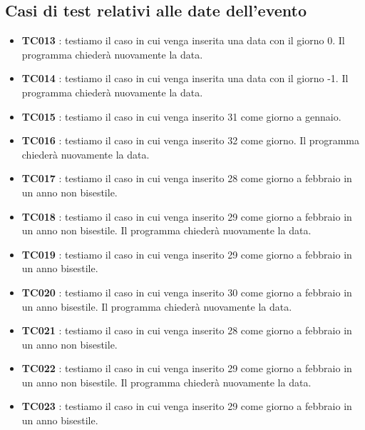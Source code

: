 \documentclass[11pt]{scrartcl} %
\begin{document}
\subsection{Casi di test relativi alle date dell'evento}

\begin{itemize}


	\item \textbf{TC013} : testiamo il caso in cui venga inserita una data con il giorno 0. Il programma chiederà nuovamente la data.

	\item \textbf{TC014} : testiamo il caso in cui venga inserita una data con il giorno -1. Il programma chiederà nuovamente la data.

	\item \textbf{TC015} : testiamo il caso in cui venga inserito 31 come giorno a gennaio.

	\item \textbf{TC016} : testiamo il caso  in cui venga inserito 32 come giorno. Il programma chiederà nuovamente la data.

	\item \textbf{TC017} : testiamo il caso  in cui venga inserito 28 come giorno a febbraio in un anno non bisestile.

	\item \textbf{TC018} : testiamo il caso  in cui venga inserito 29 come giorno a febbraio in un anno non bisestile. Il programma chiederà nuovamente la data.

	\item \textbf{TC019} : testiamo il caso in cui venga inserito 29 come giorno a febbraio in un anno bisestile.

	\item \textbf{TC020} : testiamo il caso in cui venga inserito 30 come giorno a febbraio in un anno bisestile. Il programma chiederà nuovamente la data.

	\item \textbf{TC021} : testiamo il caso in cui venga inserito 28 come giorno a febbraio in un anno non bisestile.

	\item \textbf{TC022} : testiamo il caso in cui venga inserito 29 come giorno a febbraio in un anno non bisestile. Il programma chiederà nuovamente la data.

	\item \textbf{TC023} : testiamo il caso in cui venga inserito 29 come giorno a febbraio in un anno  bisestile.


\end{itemize}
\end{document}
